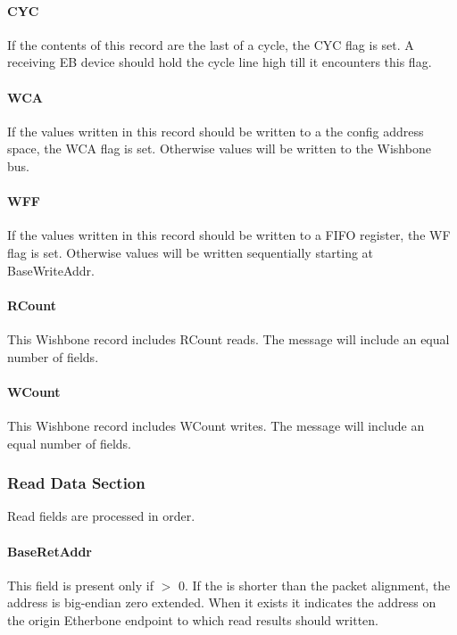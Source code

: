 \documentclass{article}
\begin{document}
\paragraph{CYC} \label{field:CYC}
If the contents of this record are the last of a cycle,
the CYC flag is set.
A receiving EB device should hold the cycle line high till it encounters this flag.

\paragraph{WCA} \label{field:WCA}
If the values written in this record should be written to a the config
address space, the WCA flag is set.
Otherwise values will be written to the Wishbone bus.

\paragraph{WFF} \label{field:WFF}
If the values written in this record should be written to a FIFO register,
the WF flag is set.
Otherwise values will be written sequentially starting at BaseWriteAddr.

\paragraph{RCount} \label{field:RCount}
This Wishbone record includes RCount reads.
The message will include an equal number of  fields.

\paragraph{WCount} \label{field:WCount}
This Wishbone record includes WCount writes.
The message will include an equal number of  fields.

\subsubsection{Read Data Section}

Read fields are processed in order.

\paragraph{BaseRetAddr} \label{field:BaseRetAddr}
This field is present only if  $>$ 0.
If the  is shorter than the packet alignment, 
the address is big-endian zero extended.
When it exists it indicates the address on the origin Etherbone endpoint 
to which read results should written.
\end{document}
